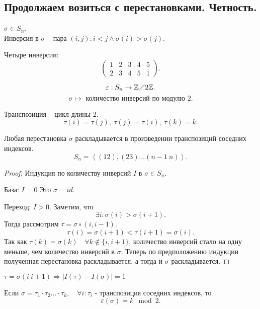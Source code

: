 \documentclass[12pt]{report}
\begin{document}
\subsection{Продолжаем возиться с перестановками. Четность.}
\begin{defn}[Инверсия]
    $\sigma \in  S_n  $. \\
    Инверсия в $\sigma $ -- пара $(i, j): i < j \wedge \sigma  (i) > \sigma (j)$.
\end{defn}
\begin{ex}
    Четыре инверсии:
    \[
	\left ( 
	\begin{array}{ccccc}
	    1 &2&3&4&5\\
	    2 &3&4&5&1
	\end{array}
	\right )
    .\] 
\end{ex}
\begin{defn}
    \[
    \varepsilon : S_n \to \mathbb{Z} \diagup 2\mathbb{Z}
    .\] 
    \[
    \sigma  \mapsto \mbox{ количество инверсий по модулю 2}
    .\] 
\end{defn}
\begin{defn}
    Транспозиция -- цикл длины 2.
    \[
	\tau(i)= \tau(j), ~\tau(j) = \tau(i), ~ \tau(k)=k
    .\] 
\end{defn}
\begin{lm}
    Любая перестановка $\sigma $ раскладывается в произведении транспозиций соседних индексов.
    \[
	S_n = \left \langle (12), (23) \ldots (n-1~n) \right \rangle
    .\] 
\end{lm}
\begin{proof}
    Индукция по количеству инверсий $I$ в $\sigma \in  S_n$.

    База: $I = 0$ Это $\sigma  = id$.

    Переход: $I>0$. Заметим, что \[
	\exists i: \sigma (i) > \sigma (i+1)
    .\] 
    Тогда рассмотрим $\tau = \sigma \circ (i, i-1)$.
    \[
	\tau(i) = \sigma (i+1) < \tau(i+1) = \sigma  (i)
    .\] 
    Так как $\tau(k) = \sigma (k) \quad \forall k \notin \{i, i+1\}$, количество инверсий стало на одну меньше, чем количество инверсий в $\sigma $.
    Теперь по предположению индукции полученная перестановка раскладывается, а тогда и $\sigma $ раскладывается.
\end{proof}
\begin{lm}
    $\tau = \sigma (i ~ i+1) \Rightarrow |I(\tau) - I(\sigma )| =1$
\end{lm}
\begin{lm}
    Если $\sigma  = \tau_1\cdot \tau_2 \ldots\cdot \tau_k, \quad \forall i: \tau_i \mbox{ - транспозиция соседних индексов}$, то \[
	\varepsilon (\sigma ) = k \mod 2
    .\] 
\end{lm}
\end{document}
